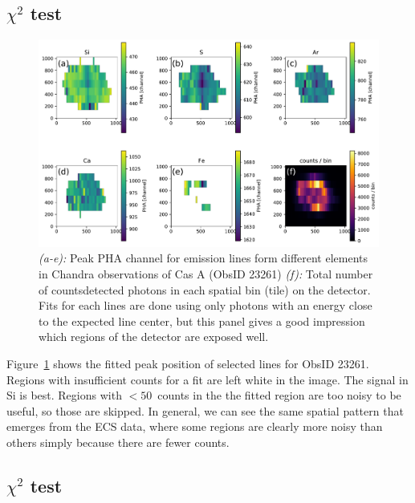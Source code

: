 \documentclass[]{spie}  %
\begin{document}
\subsection{$\chi^2$ test}
\begin{figure} [ht]
  \begin{center}
    \includegraphics[width=\textwidth]{figures/CasAlines.pdf}
  \end{center}
  \caption
      {\emph{(a-e):} Peak PHA channel for emission lines form different elements in Chandra observations of Cas A (ObsID 23261) \emph{(f):} Total number of countsdetected photons in each spatial bin (tile) on the detector. Fits for each lines are done using only photons with an energy close to the expected line center, but this panel gives a good impression which regions of the detector are exposed well.
        \label{fig:CasAlines}}
\end{figure}

Figure~\ref{fig:CasAlines} shows the fitted peak position of selected lines for ObsID 23261. Regions with insufficient counts for a fit are left white in the image. The signal in Si is best. Regions with $<50$~counts in the the fitted region are too noisy to be useful, so those are skipped.
In general, we can see the same spatial pattern that emerges from the ECS data, where some regions are clearly more noisy than others simply because there are fewer counts.

\subsection{$\chi^2$ test}
\end{document}
